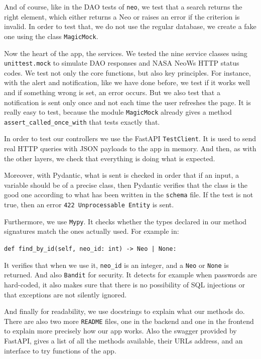 \medskip

And of course, like in the DAO tests of \texttt{neo}, we test that a search returns the right element, which either returns a Neo or raises an error if the criterion is invalid. In order to test that, we do not use the regular database, we create a fake one using the class \texttt{MagicMock}.

\bigskip

Now the heart of the app, the services. We tested the nine service classes using \texttt{unittest.mock} to simulate DAO responses and NASA NeoWs HTTP status codes. We test not only the core functions, but also key principles. For instance, with the alert and notification, like we have done before, we test if it works well and if something wrong is set, an error occurs. But we also test that a notification is sent only once and not each time the user refreshes the page. It is really easy to test, because the module \texttt{MagicMock} already gives a method \texttt{assert\_called\_once\_with} that tests exactly that.

\bigskip

In order to test our controllers we use the FastAPI \texttt{TestClient}. It is used to send real HTTP queries with JSON payloads to the app in memory. And then, as with the other layers, we check that everything is doing what is expected.

\bigskip

Moreover, with Pydantic, what is sent is checked in order that if an input, a variable should be of a precise class, then Pydantic verifies that the class is the good one according to what has been written in the \texttt{schema} file. If the test is not true, then an error \texttt{422 Unprocessable Entity} is sent.

Furthermore, we use \texttt{Mypy}. It checks whether the types declared in our method signatures match the ones actually used. For example in: 

\texttt{def find\_by\_id(self, neo\_id: int) -> Neo | None:}

It verifies that when we use it, \texttt{neo\_id} is an integer, and a \texttt{Neo} or \texttt{None} is returned. And also \texttt{Bandit} for security. It detects for example when passwords are hard-coded, it also makes sure that there is no possibility of SQL injections or that exceptions are not silently ignored.

And finally for readability, we use docstrings to explain what our methods do. There are also two more \texttt{README} files, one in the backend and one in the frontend to explain more precisely how our app works. Also the swagger provided by FastAPI, gives a list of all the methods available, their URLs address, and an interface to try functions of the app.


